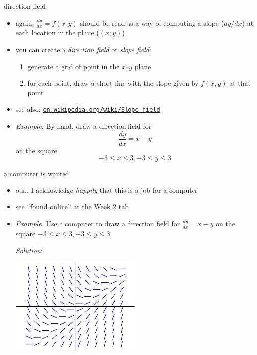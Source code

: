 \documentclass{beamer}
\begin{document}
\begin{frame}{direction field}

\begin{itemize}
\item again, $\frac{dy}{dx} = f(x,y)$ should be read as a way of computing a slope ($dy/dx$) at each location in the plane ($(x,y)$)
\item you can create a \emph{direction field} or \emph{slope field}:
    \begin{enumerate}
    \item generate a grid of point in the $x$--$y$ plane
    \item for each point, draw a short line with the slope given by $f(x,y)$ at that point
    \end{enumerate}
\item see also: \small \href{https://en.wikipedia.org/wiki/Slope_field}{\color{blue} \texttt{en.wikipedia.org/wiki/Slope\_field}} \normalsize

\bigskip
\item \begin{minipage}[t]{0.375\textwidth}
\emph{Example.}  By hand, draw a direction field for
$$\frac{dy}{dx} = x-y$$
on the square
$$-3 \le x \le 3, -3 \le y \le 3$$
\end{minipage} 

\vspace{20mm}
\end{itemize}
\end{frame}


\begin{frame}{a computer is wanted}

\begin{itemize}
\item o.k., I acknowledge \emph{happily} that this is a job for a computer
\item see ``found online'' at the \href{https://bueler.github.io/math302/week2.html}{\color{blue} Week 2 tab}
\item \emph{Example.}  Use a computer to draw a direction field for
$\frac{dy}{dx} = x-y$ on the square $-3 \le x \le 3, -3 \le y \le 3$

\bigskip
\emph{Solution}:

\vspace{-5mm}
\hfill \includegraphics[width=0.5\textwidth]{figs/example-field}
\end{itemize}
\end{frame}
\end{document}
